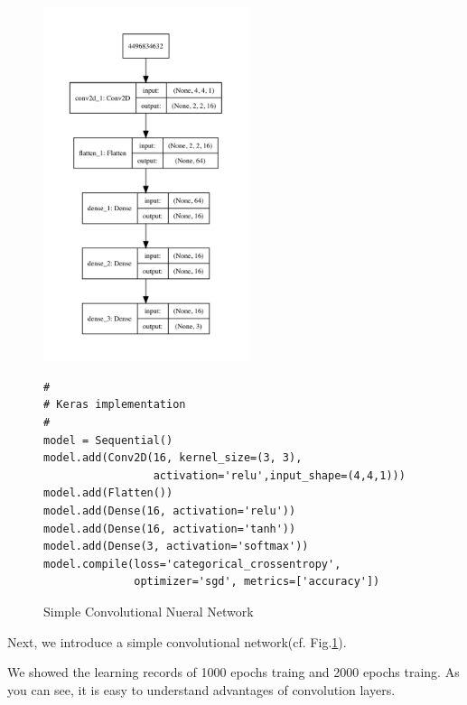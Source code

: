 \documentclass{article}
\begin{document}
\begin{figure}
\begin{center}
\includegraphics[width=6cm]{../dump/model2.pdf}
\end{center}
\begin{verbatim}
#
# Keras implementation
#
model = Sequential()
model.add(Conv2D(16, kernel_size=(3, 3),
                 activation='relu',input_shape=(4,4,1)))
model.add(Flatten())
model.add(Dense(16, activation='relu'))
model.add(Dense(16, activation='tanh'))
model.add(Dense(3, activation='softmax'))
model.compile(loss='categorical_crossentropy',
              optimizer='sgd', metrics=['accuracy'])
\end{verbatim}
\caption{Simple Convolutional Nueral Network}\label{fig:3}
\end{figure}

Next, we introduce a simple convolutional network(cf. Fig.\ref{fig:3}).

We showed the learning records of 1000 epochs traing
and 2000 epochs traing.
As you can see, it is easy to understand advantages
of convolution layers.
\end{document}
